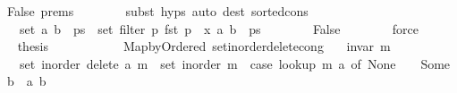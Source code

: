 \begin{isabellebody}
\ False\ {\isachardoublequoteopen}{}{\isachardot}{\kern0pt}prems{\isachardoublequoteclose}\isanewline
\ \ \ \ \ \ \isamarkupfalse%
\ {\isacharparenleft}{\kern0pt}subst\ {\isachardoublequoteopen}{}{\isachardot}{\kern0pt}hyps{\isachardoublequoteclose}{\isacharparenright}{\kern0pt}\ {\isacharparenleft}{\kern0pt}auto\ dest{\isacharcolon}{\kern0pt}\ sorted{\isacharunderscore}{\kern0pt}cons{\isacharparenright}{\kern0pt}\isanewline
\ \ \ \ \isamarkupfalse%
\ \isamarkupfalse%
\ {\isachardoublequoteopen}{\isachardot}{\kern0pt}{\isachardot}{\kern0pt}{\isachardot}{\kern0pt}\ {\isacharequal}{\kern0pt}\ set\ {\isacharparenleft}{\kern0pt}{\isacharparenleft}{\kern0pt}a{\isacharcomma}{\kern0pt}\ b{\isacharparenright}{\kern0pt}\ {\isacharhash}{\kern0pt}\ ps{\isacharparenright}{\kern0pt}\ {\isacharminus}{\kern0pt}\ set\ {\isacharparenleft}{\kern0pt}filter\ {\isacharparenleft}{\kern0pt}{\isasymlambda}p{\isachardot}{\kern0pt}\ fst\ p\ {\isacharequal}{\kern0pt}\ x{\isacharparenright}{\kern0pt}\ {\isacharparenleft}{\kern0pt}{\isacharparenleft}{\kern0pt}a{\isacharcomma}{\kern0pt}\ b{\isacharparenright}{\kern0pt}\ {\isacharhash}{\kern0pt}\ ps{\isacharparenright}{\kern0pt}{\isacharparenright}{\kern0pt}{\isachardoublequoteclose}\isanewline
\ \ \ \ \ \ \isamarkupfalse%
\ False\isanewline
\ \ \ \ \ \ \isamarkupfalse%
\ force\isanewline
\ \ \ \ \isamarkupfalse%
\ \isamarkupfalse%
\ {\isacharquery}{\kern0pt}thesis\isanewline
\ \ \ \ \ \ \isacommand{{\isachardot}{\kern0pt}}\isamarkupfalse%
\isanewline
\ \ \isamarkupfalse%
\isanewline
{}\isamarkupfalse%
%
\endisatagproof
{\isafoldproof}%
%
\isadelimproof
\isanewline
%
\endisadelimproof
\isanewline
{}\isamarkupfalse%
\ {\isacharparenleft}{\kern0pt}\ Map{\isacharunderscore}{\kern0pt}by{\isacharunderscore}{\kern0pt}Ordered{\isacharparenright}{\kern0pt}\ set{\isacharunderscore}{\kern0pt}inorder{\isacharunderscore}{\kern0pt}delete{\isacharunderscore}{\kern0pt}cong{\isacharcolon}{\kern0pt}\isanewline
\ \ \ {\isachardoublequoteopen}invar\ m{\isachardoublequoteclose}\isanewline
\ \ \ {\isachardoublequoteopen}set\ {\isacharparenleft}{\kern0pt}inorder\ {\isacharparenleft}{\kern0pt}delete\ a\ m{\isacharparenright}{\kern0pt}{\isacharparenright}{\kern0pt}\ {\isacharequal}{\kern0pt}\ set\ {\isacharparenleft}{\kern0pt}inorder\ m{\isacharparenright}{\kern0pt}\ {\isacharminus}{\kern0pt}\ {\isacharparenleft}{\kern0pt}case\ lookup\ m\ a\ of\ None\ {\isasymRightarrow}\ {\isacharbraceleft}{\kern0pt}{\isacharbraceright}{\kern0pt}\ {\isacharbar}{\kern0pt}\ Some\ b\ {\isasymRightarrow}\ {\isacharbraceleft}{\kern0pt}{\isacharparenleft}{\kern0pt}a{\isacharcomma}{\kern0pt}\ b{\isacharparenright}{\kern0pt}{\isacharbraceright}{\kern0pt}{\isacharparenright}{\kern0pt}{\isachardoublequoteclose}\isanewline

\end{isabellebody}
